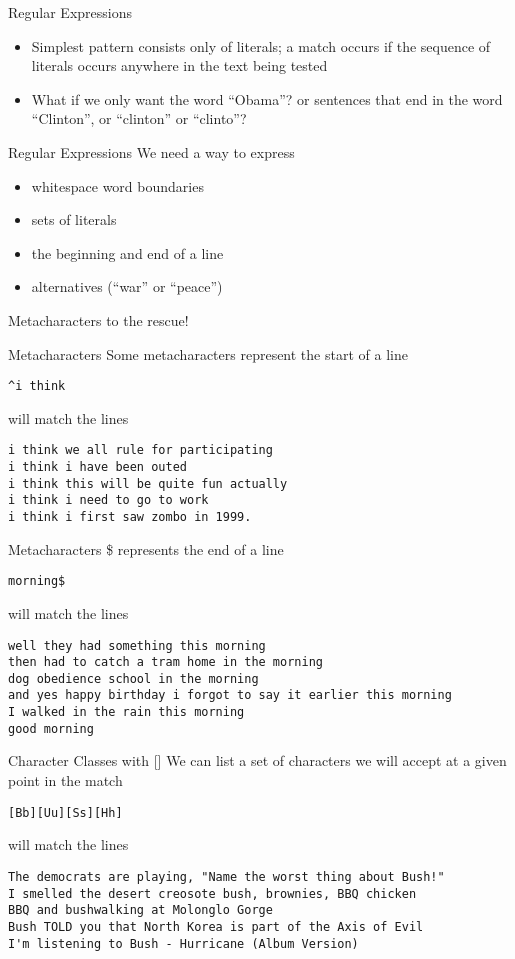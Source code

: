 \documentclass[aspectratio=169]{beamer}
\begin{document}
\begin{frame}{Regular Expressions}
\begin{itemize}
\item
Simplest pattern consists only of literals; a match occurs if the
sequence of literals occurs anywhere in the text being tested
\item
What if we only want the word ``Obama''? or sentences that end in 
the word ``Clinton'', or ``clinton'' or ``clinto''? 
\end{itemize}
\end{frame}

\begin{frame}{Regular Expressions}
We need a way to express
\begin{itemize}
\item
whitespace word boundaries
\item
sets of literals
\item
the beginning and end of a line
\item
alternatives (``war'' or ``peace'')
\end{itemize}
Metacharacters to the rescue!
\end{frame}

\begin{frame}[fragile]{Metacharacters}
Some metacharacters represent the start of a line
\begin{verbatim}
^i think 
\end{verbatim}
will match the lines 
\begin{verbatim}
i think we all rule for participating
i think i have been outed
i think this will be quite fun actually
i think i need to go to work
i think i first saw zombo in 1999.
\end{verbatim}
\end{frame}

\begin{frame}[fragile]{Metacharacters}
\$ represents the end of a line
\begin{verbatim}
morning$ 
\end{verbatim}
will match the lines 
\begin{verbatim}
well they had something this morning
then had to catch a tram home in the morning
dog obedience school in the morning
and yes happy birthday i forgot to say it earlier this morning 
I walked in the rain this morning
good morning
\end{verbatim}
\end{frame}

\begin{frame}[fragile]{Character Classes with []}
We can list a set of characters we will accept at a given point in the
match
\begin{verbatim}
[Bb][Uu][Ss][Hh]
\end{verbatim}
will match the lines 
\begin{verbatim}
The democrats are playing, "Name the worst thing about Bush!"
I smelled the desert creosote bush, brownies, BBQ chicken
BBQ and bushwalking at Molonglo Gorge
Bush TOLD you that North Korea is part of the Axis of Evil 
I'm listening to Bush - Hurricane (Album Version)
\end{verbatim}
\end{frame}
\end{document}
